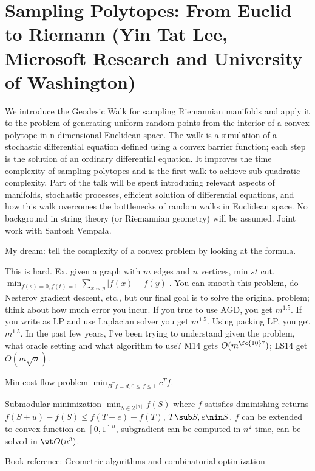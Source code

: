 \section{Sampling Polytopes: From Euclid to Riemann (Yin Tat Lee, Microsoft Research and University of Washington)}


We introduce the Geodesic Walk for sampling Riemannian manifolds and apply it to the problem of generating uniform random points from the interior of a convex polytope in n-dimensional Euclidean space. The walk is a simulation of a stochastic differential equation defined using a convex barrier function; each step is the solution of an ordinary differential equation. It improves the time complexity of sampling polytopes and is the first walk to achieve sub-quadratic complexity. Part of the talk will be spent introducing relevant aspects of manifolds, stochastic processes, efficient solution of differential equations, and how this walk overcomes the bottlenecks of random walks in Euclidean space. No background in string theory (or Riemannian geometry) will be assumed. 
Joint work with Santosh Vempala.

My dream: tell the complexity of a convex problem by looking at the formula. 

This is hard. Ex. given a graph with $m$ edges and $n$ vertices, min $st$ cut, $\min_{f(s)=0,f(t)=1} \sum_{x\sim y} |f(x)-f(y)|$. You can smooth this problem, do Nesterov gradient descent, etc., but our final goal is to solve the original problem; think about how much error you incur. If you true to use AGD, you get $m^{1.5}$. If you write as LP and use Laplacian solver you get $m^{1.5}$. Using packing LP, you get $m^{1.5}$. %
In the past few years, I've been trying to understand given the problem, what oracle setting and what algorithm to use? M14 gets $O(m^{\fc{10}7})$; LS14 get $O(m\sqrt n)$. 

Min cost flow problem $\min_{B^Tf=d, 0\le f\le 1} c^Tf$. 

Submodular minimization $\min_{S\in 2^{[n]}} f(S)$ where $f$ satisfies diminishing returns $f(S+u) - f(S)\le f(T+e)-f(T)$, $T\sub S, e\nin S$. $f$ can be extended to convex function on $[0,1]^n$, subgradient can be computed in $n^2$ time, can be solved in $\wt O(n^3)$.

Book reference: Geometric algorithms and combinatorial optimization

